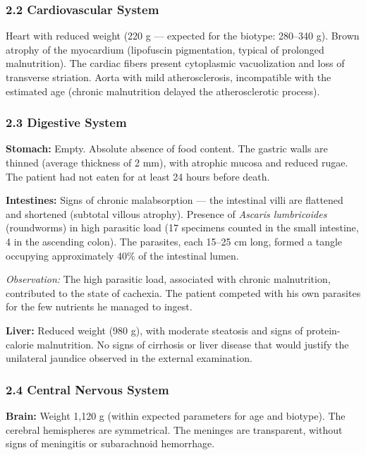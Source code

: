 \subsubsection*{2.2 Cardiovascular System}

\noindent Heart with reduced weight (220 g --- expected for the biotype: 280--340 g). Brown atrophy of the myocardium (lipofuscin pigmentation, typical of prolonged malnutrition). The cardiac fibers present cytoplasmic vacuolization and loss of transverse striation. Aorta with mild atherosclerosis, incompatible with the estimated age (chronic malnutrition delayed the atherosclerotic process).

\subsubsection*{2.3 Digestive System}

\noindent \textbf{Stomach:} Empty. Absolute absence of food content. The gastric walls are thinned (average thickness of 2 mm), with atrophic mucosa and reduced rugae. The patient had not eaten for at least 24 hours before death.

\noindent \textbf{Intestines:} Signs of chronic malabsorption --- the intestinal villi are flattened and shortened (subtotal villous atrophy). Presence of \textit{Ascaris lumbricoides} (roundworms) in high parasitic load (17 specimens counted in the small intestine, 4 in the ascending colon). The parasites, each 15--25 cm long, formed a tangle occupying approximately 40\% of the intestinal lumen.

\noindent \textit{Observation:} The high parasitic load, associated with chronic malnutrition, contributed to the state of cachexia. The patient competed with his own parasites for the few nutrients he managed to ingest.

\noindent \textbf{Liver:} Reduced weight (980 g), with moderate steatosis and signs of protein-calorie malnutrition. No signs of cirrhosis or liver disease that would justify the unilateral jaundice observed in the external examination.

\subsubsection*{2.4 Central Nervous System}

\noindent \textbf{Brain:} Weight 1,120 g (within expected parameters for age and biotype). The cerebral hemispheres are symmetrical. The meninges are transparent, without signs of meningitis or subarachnoid hemorrhage.

